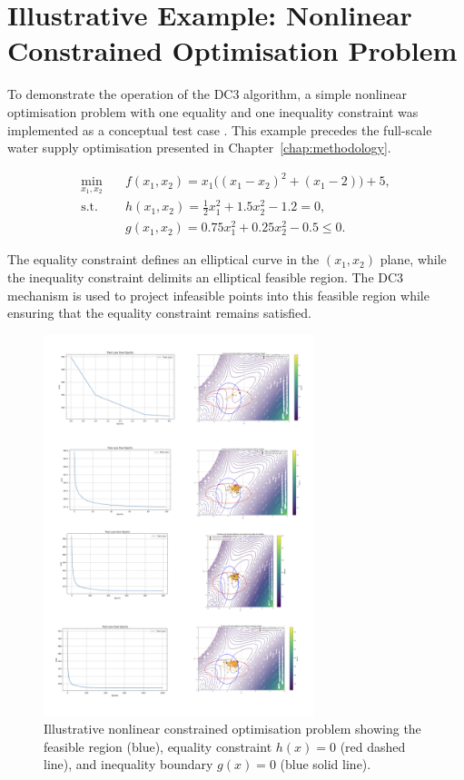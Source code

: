 \section{Illustrative Example: Nonlinear Constrained Optimisation Problem}

To demonstrate the operation of the DC3 algorithm, a simple nonlinear optimisation problem with one equality and one inequality constraint was implemented as a conceptual test case \cite{rfc21}. This example precedes the full-scale water supply optimisation presented in Chapter~\ref{chap:methodology}.

\begin{equation}
\begin{aligned}
\min_{x_1, x_2} \quad & f(x_1, x_2) = x_1 \big((x_1 - x_2)^2 + (x_1 - 2)\big) + 5, \\
\text{s.t.} \quad & h(x_1, x_2) = \tfrac{1}{2}x_1^2 + 1.5x_2^2 - 1.2 = 0, \\
& g(x_1, x_2) = 0.75x_1^2 + 0.25x_2^2 - 0.5 \le 0.
\end{aligned}
\end{equation}

The equality constraint defines an elliptical curve in the $(x_1, x_2)$ plane, while the inequality constraint delimits an elliptical feasible region. The DC3 mechanism is used to project infeasible points into this feasible region while ensuring that the equality constraint remains satisfied.

\begin{figure}[H]
    \centering
    \includegraphics[width=0.7\textwidth]{figs/nonlinear_problem.jpeg}
    \caption{Illustrative nonlinear constrained optimisation problem showing the feasible region (blue), equality constraint $h(x)=0$ (red dashed line), and inequality boundary $g(x)=0$ (blue solid line).}
    \label{figs:nonlinear_problem}
\end{figure}

